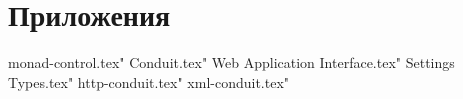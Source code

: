 \part*{Приложения}

\appendix

 monad-control.tex"
 Conduit.tex"
 Web Application Interface.tex"
 Settings Types.tex"
 http-conduit.tex"
 xml-conduit.tex"
